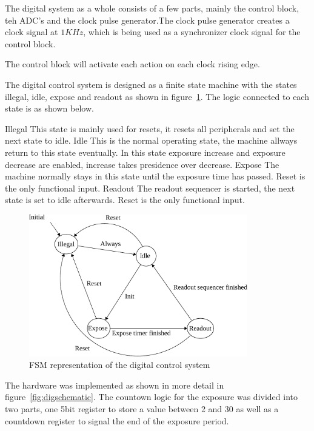 The digital system as a whole consists of a few parts, mainly the control block, teh ADC's and the clock pulse generator.The clock pulse generator creates a clock signal at $1KHz$, which is being used as a synchronizer clock signal for the control block.

The control block will activate each action on each clock rising edge. 

The digital control system is designed as a finite state machine with the states illegal, idle, expose and readout as shown in figure~\ref{fig:fsmDiagram}.
The logic connected to each state is as shown below.

\begin{outline}
  \1 Illegal
  \2 This state is mainly used for resets, it resets all peripherals and set the next state to idle.
  \1 Idle
  \2 This is the normal operating state, the machine allways return to this state eventually.
  \2 In this state exposure increase and exposure decrease are enabled, increase takes presidence over decrease.
  \1 Expose
  \2 The machine normally stays in this state until the exposure time has passed.
  \2 Reset is the only functional input.
  \1 Readout
  \2 The readout sequencer is started, the next state is set to idle afterwards.
  \2 Reset is the only functional input.
\end{outline}

\begin{figure}[htbp]
  \centering
  \includegraphics[width=0.85\textwidth]{figures/fsmDiagram}
  \caption{FSM representation of the digital control system}
  \label{fig:fsmDiagram}
\end{figure}

The hardware was implemented as shown in more detail in figure~\ref{fig:digschematic}.
The countown logic for the exposure was divided into two parts, one 5bit register to store a value between 2 and 30 as well as a countdown register
to signal the end of the exposure period.

